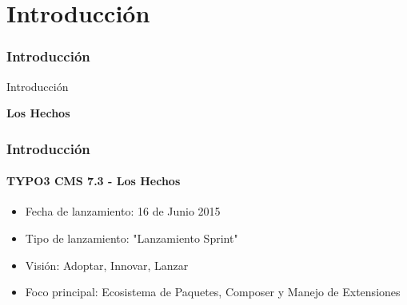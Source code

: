 %

\section{Introducción}
\begin{frame}[fragile]
	\frametitle{Introducción}

	\begin{center}\huge{Introducción}\end{center}
	\begin{center}\huge{\color{typo3darkgrey}\textbf{Los Hechos}}\end{center}

\end{frame}

\begin{frame}[fragile]
	\frametitle{Introducción}
	\framesubtitle{TYPO3 CMS 7.3 - Los Hechos}

	\begin{itemize}
		\item Fecha de lanzamiento: 16 de Junio 2015
		\item Tipo de lanzamiento: "Lanzamiento Sprint"
		\item Visión: Adoptar, Innovar, Lanzar
		\item Foco principal: Ecosistema de Paquetes, Composer y Manejo de Extensiones
	\end{itemize}

\end{frame}

